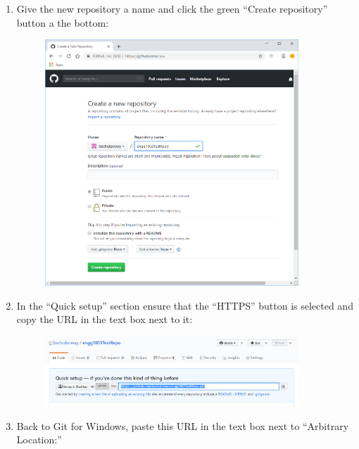\documentclass{lab}
\begin{document}
\begin{task}{}{}
\begin{enumerate}
\pagebreak

\item Give the new repository a name and click the green ``Create repository'' button a the bottom:

\begin{figure}[H]
\begin{center}
\includegraphics[width=0.9\textwidth]{Wk1Images/git5}
\end{center}
\end{figure}

\item In the ``Quick setup'' section ensure that the ``HTTPS'' button is selected and copy the URL in the text box next to it:

\begin{figure}[H]
\begin{center}
\includegraphics[width=0.9\textwidth]{Wk1Images/git6}
\end{center}
\end{figure}

\pagebreak

\item Back to Git for Windows, paste this URL in the text box next to ``Arbitrary Location:''


\end{enumerate}
\end{task}
\end{document}

